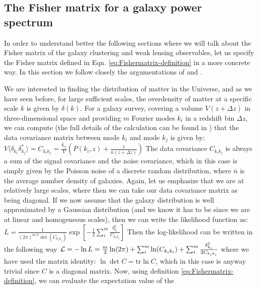 \subsection{The Fisher matrix for a galaxy power spectrum}

In order to understand better the following sections where we will talk about the 
Fisher matrix of the galaxy clustering and weak lensing observables, let us specify the Fisher
matrix defined in Eqn. \ref{eq:Fishermatrix-definition} in a more concrete way.
In this section we follow closely the argumentations of \cite{cite Dodelson} and \cite{cite Amendola}.

We are interested in finding the distribution of matter in the Universe, and as we have seen before,
for large sufficient scales, the overdensity of matter at a specific scale $k$ is given by $\delta(k)$.
For a galaxy survey, covering a volume $V(z+ \Delta z)$ in three-dimensional space and providing
$m$ Fourier modes $k_i$ in a redshift bin $\Delta z$, 
we can compute (the full details of the calculation can be found in \cite{cite Dodelson})
that the data covariance matrix between mode $k_i$ and mode $k_j$ is given by:
\beeq$\label{eq:dataCovariancePk}
V \langle\delta_{k_i} \delta^*_{k_j} \rangle = C_{k_{i} k_{j}} = \frac{\delta_{ij}}{V} \left( P(k_i, z) + \frac{1}{\bar{n}(z+\Delta z)} \right)
$
The data covariance $C_{k_{i} k_{j}}$ is always a sum of the signal covariance and the noise covariance, which 
in this case is simply given by the Poisson noise of a discrete random distribution, where $\bar n$ is the 
average number density of galaxies. Again, let us emphasize that we are at relatively large scales, where then
we can take our data covariance matrix as being diagonal.
If we now assume that the galaxy distribution is well approximated by a Gaussian distribution (and we 
know it has to be since we are at linear and homogeneous scales), then we can
write the likelihood function as:
\beeq$\label{eq:likelihood-Pofk}
L=\frac{1}{(2\pi)^{m/2} \det (C_{k_{i} k_{j}}) } \exp \left[-\frac{1}{2}\sum_{i}^{m} 
\frac{\delta^2_{k_i}}{C_{k_{i} k_{j}}} \right] $
Then the log-likelihood can be written in the following way
\beeq$\label{eq:loglik-Pk}
\mathcal{L} = -\ln L = \frac{m}{2} \ln(2\pi) + \sum_{i}^{m}\ln(C_{k_{i} k_{i}}) + \sum_{i}^{m}\frac{\delta^2_{k_i}}{2 C_{k_{i} k_{i}}}
$
where we have used the matrix identity: $\ln \det C = \mathrm{tr} \ln C$, which in this case is anyway trivial since $C$ is a diagonal matrix.
Now, using definition \ref{eq:Fishermatrix-definition}, we can evaluate the expectation value of the 
